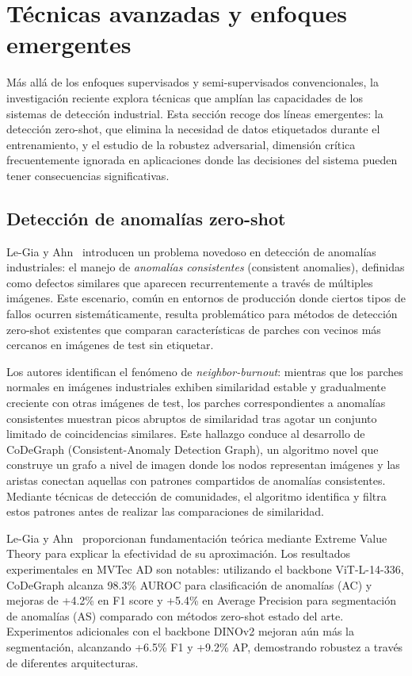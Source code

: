 \section{Técnicas avanzadas y enfoques emergentes}

Más allá de los enfoques supervisados y semi-supervisados convencionales, la investigación reciente explora técnicas que amplían las capacidades de los sistemas de detección industrial. Esta sección recoge dos líneas emergentes: la detección zero-shot, que elimina la necesidad de datos etiquetados durante el entrenamiento, y el estudio de la robustez adversarial, dimensión crítica frecuentemente ignorada en aplicaciones donde las decisiones del sistema pueden tener consecuencias significativas.

\subsection{Detección de anomalías zero-shot}

Le-Gia y Ahn~\cite{legia2025consistent} introducen un problema novedoso en detección de anomalías industriales: el manejo de \textit{anomalías consistentes} (consistent anomalies), definidas como defectos similares que aparecen recurrentemente a través de múltiples imágenes. Este escenario, común en entornos de producción donde ciertos tipos de fallos ocurren sistemáticamente, resulta problemático para métodos de detección zero-shot existentes que comparan características de parches con vecinos más cercanos en imágenes de test sin etiquetar.

Los autores identifican el fenómeno de \textit{neighbor-burnout}: mientras que los parches normales en imágenes industriales exhiben similaridad estable y gradualmente creciente con otras imágenes de test, los parches correspondientes a anomalías consistentes muestran picos abruptos de similaridad tras agotar un conjunto limitado de coincidencias similares. Este hallazgo conduce al desarrollo de CoDeGraph (Consistent-Anomaly Detection Graph), un algoritmo novel que construye un grafo a nivel de imagen donde los nodos representan imágenes y las aristas conectan aquellas con patrones compartidos de anomalías consistentes. Mediante técnicas de detección de comunidades, el algoritmo identifica y filtra estos patrones antes de realizar las comparaciones de similaridad.

Le-Gia y Ahn~\cite{legia2025consistent} proporcionan fundamentación teórica mediante Extreme Value Theory para explicar la efectividad de su aproximación. Los resultados experimentales en MVTec AD son notables: utilizando el backbone ViT-L-14-336, CoDeGraph alcanza 98.3\% AUROC para clasificación de anomalías (AC) y mejoras de +4.2\% en F1 score y +5.4\% en Average Precision para segmentación de anomalías (AS) comparado con métodos zero-shot estado del arte. Experimentos adicionales con el backbone DINOv2 mejoran aún más la segmentación, alcanzando +6.5\% F1 y +9.2\% AP, demostrando robustez a través de diferentes arquitecturas.

